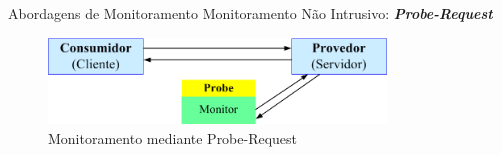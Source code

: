 \documentclass[xcolor=svgnames]{beamer}
\begin{document}

    \begin{frame}{Abordagens de Monitoramento }
	  Monitoramento Não Intrusivo: \textbf{\textit{Probe-Request}}
          \begin{figure}[!h]
              \centering
              \includegraphics[width=0.8\textwidth]{MonitoringApproaches_3.png}
              \caption{Monitoramento mediante Probe-Request}
          \end{figure}	
    \end{frame}
\end{document}
